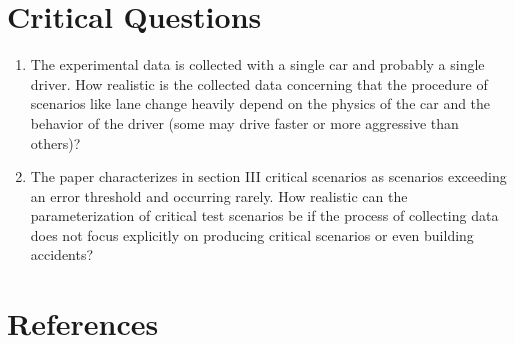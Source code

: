 \documentclass[oneside, notitlepage, twocolumn]{scrartcl}
\begin{document}
\section{Critical Questions}
\begin{enumerate}
    \item The experimental data is collected with a single car and probably a single driver.
        How realistic is the collected data concerning that the procedure of scenarios like lane change heavily depend on the physics of the car and the behavior of the driver (some may drive faster or more aggressive than others)?
    \item The paper characterizes in section III critical scenarios as scenarios exceeding an error threshold and occurring rarely.
        How realistic can the parameterization of critical test scenarios be if the process of collecting data does not focus explicitly on producing critical scenarios or even building accidents?
\end{enumerate}

\section{References}
\begingroup
\renewcommand{\section}[2]{}%
\nocite{*}
\printbibliography%
\endgroup
\end{document}
